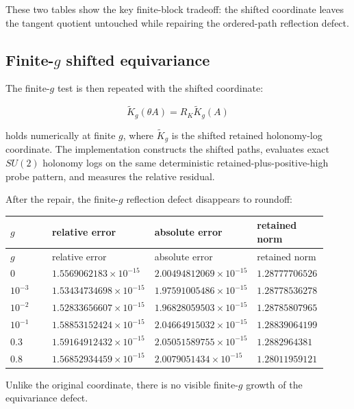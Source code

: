 \documentclass[10pt]{article}
\begin{document}
These two tables show the key finite-block tradeoff: the shifted coordinate leaves the tangent quotient untouched while repairing the ordered-path reflection defect.

\subsection{Finite-\(g\) shifted equivariance}

The finite-\(g\) test is then repeated with the shifted coordinate:

\[
\widetilde K_g(\theta A)
=
R_K\widetilde K_g(A)
\]

holds numerically at finite \(g\), where \(\widetilde K_g\) is the shifted retained holonomy-log coordinate.  The implementation constructs the shifted paths, evaluates exact \(SU(2)\) holonomy logs on the same deterministic retained-plus-positive-high probe pattern, and measures the relative residual.

After the repair, the finite-\(g\) reflection defect disappears to roundoff:

\begin{center}
\small
\begin{longtable}{|p{0.23\linewidth}|p{0.23\linewidth}|p{0.23\linewidth}|p{0.23\linewidth}|}
\hline
\(g\) & relative error & absolute error & retained norm \\
\hline
\endfirsthead
\hline
\(g\) & relative error & absolute error & retained norm \\
\hline
\endhead
\(0\) & \(1.5569062183\times10^{-15}\) & \(2.00494812069\times10^{-15}\) & \(1.28777706526\) \\
\hline
\(10^{-3}\) & \(1.53434734698\times10^{-15}\) & \(1.97591005486\times10^{-15}\) & \(1.28778536278\) \\
\hline
\(10^{-2}\) & \(1.52833656607\times10^{-15}\) & \(1.96828059503\times10^{-15}\) & \(1.28785807965\) \\
\hline
\(10^{-1}\) & \(1.58853152424\times10^{-15}\) & \(2.04664915032\times10^{-15}\) & \(1.28839064199\) \\
\hline
\(0.3\) & \(1.59164912432\times10^{-15}\) & \(2.05051589755\times10^{-15}\) & \(1.2882964381\) \\
\hline
\(0.8\) & \(1.56852934459\times10^{-15}\) & \(2.0079051434\times10^{-15}\) & \(1.28011959121\) \\
\hline
\end{longtable}
\end{center}

Unlike the original coordinate, there is no visible finite-\(g\) growth of the equivariance defect.
\end{document}
